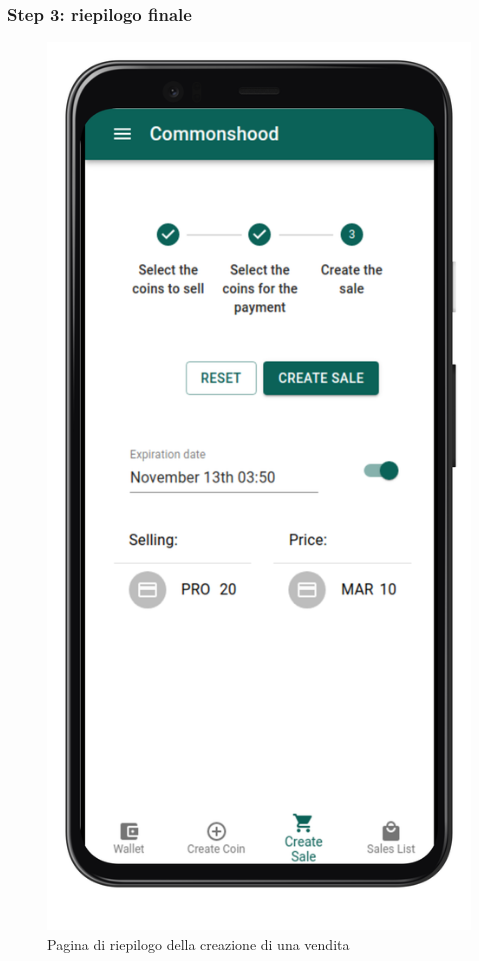\documentclass[a4paper]{article}
\begin{document}
        \subsubsection{Step 3: riepilogo finale}
        \begin{figure}[H]
          \includegraphics[scale=0.16]{resume.png}
          \centering
          \caption{Pagina di riepilogo della creazione di una vendita}
          \centering
          \label{fig:resume}
        \end{figure}
\end{document}

